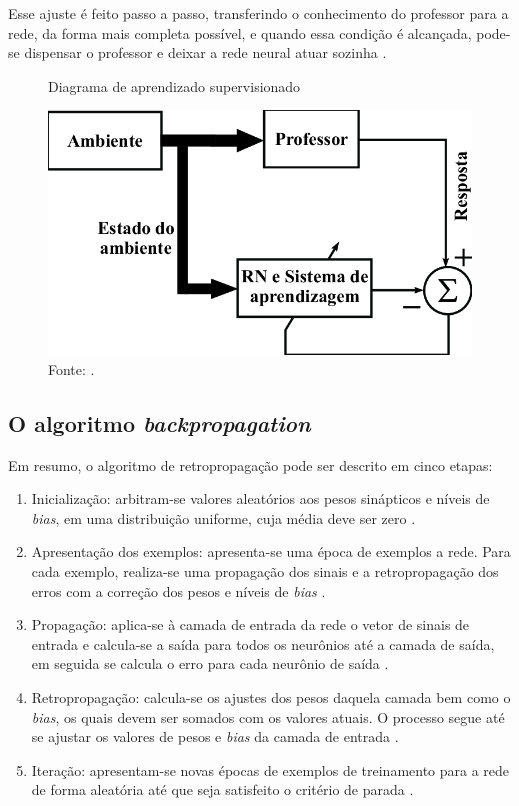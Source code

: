 Esse ajuste é feito passo a passo, transferindo o conhecimento do professor para a rede, da forma mais completa possível, e quando essa condição é alcançada, pode-se dispensar o professor e deixar a rede neural atuar sozinha \cite{haykin}.

\begin{figure}[H]
	\vspace{4mm}
	\centering
	\caption{Diagrama de aprendizado supervisionado}
	\label{fig:aprendizado}
	\includegraphics[scale=0.3]{imagens/aprendizado}
	\caption*{Fonte: .}
\end{figure}

\subsection{O algoritmo \textit{backpropagation}}
Em resumo, o algoritmo de retropropagação pode ser descrito em cinco etapas:

\begin{enumerate}
	\item Inicialização: arbitram-se valores aleatórios aos pesos sinápticos e níveis de \textit{bias}, em uma distribuição uniforme, cuja média deve ser zero \cite{redesemc}.

\item Apresentação dos exemplos: apresenta-se uma época de exemplos a rede. Para cada exemplo, realiza-se uma propagação dos sinais e a retropropagação dos erros com a correção dos pesos e níveis de \textit{bias} \cite{redesemc}.

\item Propagação: aplica-se à camada de entrada da rede o vetor de sinais de entrada e calcula-se a saída para todos os neurônios até a camada de saída, em seguida se calcula o erro para cada neurônio de saída \cite{redesemc}.

\item Retropropagação: calcula-se os ajustes dos pesos daquela camada bem como o \textit{bias}, os quais devem ser somados com os valores atuais. O processo segue até se ajustar os valores de pesos e \textit{bias} da camada de entrada \cite{redesemc}.

\item Iteração: apresentam-se novas épocas de exemplos de treinamento para a rede de forma aleatória até que seja satisfeito o critério de parada \cite{redesemc}.

\end{enumerate}
